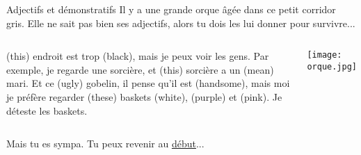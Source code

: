 \documentclass{beamer}
\begin{document}
  \begin{frame}{Adjectifs et démonstratifs}
    \hypertarget{adjectifs}{}
    Il y a une grande orque âgée dans ce petit corridor gris.
    Elle ne sait pas bien ses adjectifs, alors tu dois les lui donner pour survivre...

    \vspace{0.25cm}
    \begin{columns}
        \small
        \underline{} (this) endroit est trop \underline{} (black), mais je peux voir les gens.
        Par exemple, je regarde une sorcière, et \underline{} (this) sorcière a un \underline{} (mean) mari.
        Et ce \underline{} (ugly) gobelin, il pense qu'il est \underline{} (handsome), mais moi je préfère regarder \underline{} (these) baskets \underline{} (white), \underline{} (purple) et \underline{} (pink).
        Je déteste les baskets.

        \begin{center}
          \texttt{[image: orque.jpg]}
        \end{center}
    \end{columns}
    \vspace{0.25cm}
    Mais tu es sympa.
    Tu peux revenir au \hyperlink{début}{début}...
  \end{frame}
\end{document}
